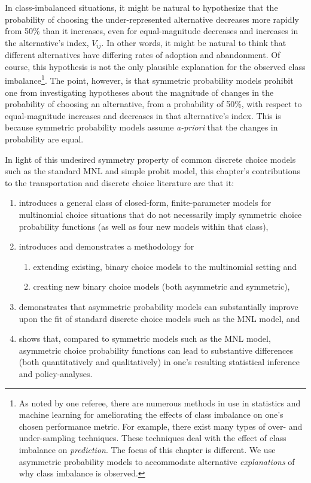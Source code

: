 In class-imbalanced situations, it might be natural to hypothesize that the probability of choosing the under-represented alternative decreases more rapidly from 50\% than it increases, even for equal-magnitude decreases and increases in the alternative's index, $V_{ij}$. In other words, it might be natural to think that different alternatives have differing rates of adoption and abandonment. Of course, this hypothesis is not the only plausible explanation for the observed class imbalance\footnote{As noted by one referee, there are numerous methods in use in statistics and machine learning for ameliorating the effects of class imbalance on one's chosen performance metric. For example, there exist many types of over- and under-sampling techniques. These techniques deal with the effect of class imbalance on \textit{prediction}. The focus of this chapter is different. We use asymmetric probability models to accommodate alternative \textit{explanations} of why class imbalance is observed.}. The point, however, is that symmetric probability models prohibit one from investigating hypotheses about the magnitude of changes in the probability of choosing an alternative, from a probability of 50\%, with respect to equal-magnitude increases and decreases in that alternative's index. This is because symmetric probability models assume \textit{a-priori} that the changes in probability are equal. 

In light of this undesired symmetry property of common discrete choice models such as the standard MNL and simple probit model, this chapter's contributions to the transportation and discrete choice literature are that it:
\begin{enumerate}
\item introduces a general class of closed-form, finite-parameter models for multinomial choice situations that do not necessarily imply symmetric choice probability functions (as well as four new models within that class),

\item introduces and demonstrates a methodology for
    \begin{enumerate}
        \item extending existing, binary choice models to the multinomial setting and
        \item creating new binary choice models (both asymmetric and symmetric),
	\end{enumerate}

\item demonstrates that asymmetric probability models can substantially improve upon the fit of standard discrete choice models such as the MNL model, and
 
\item shows that, compared to symmetric models such as the MNL model, asymmetric choice probability functions can lead to substantive differences (both quantitatively and qualitatively) in one's resulting statistical inference and policy-analyses.
\end{enumerate}

